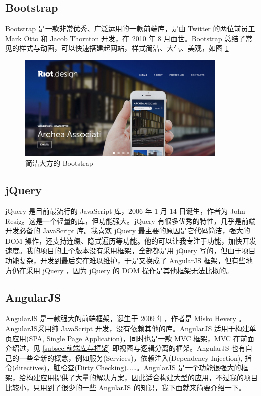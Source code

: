         \subsection{Bootstrap}
          \label{subsec:Bootstrap}
            Bootstrap 是一款非常优秀、广泛运用的一款前端库，是由 Twitter 的两位前员工 Mark Otto 和 Jacob Thornton 开发，在 2010 年 8 月面世。Bootstrap 总结了常见的样式与动画，可以快速搭建起网站，样式简洁、大气、美观，如图 \ref{fig:bootstrap}
            \begin{figure}[H]
              \centering
              \includegraphics[width=10cm]{./img/bootstrap.png}
              \caption{简洁大方的 Bootstrap}
              \label{fig:bootstrap}
            \end{figure}

        \subsection{jQuery}
          \label{subsec:jquery}
            jQuery 是目前最流行的 JavaScript 库，2006 年 1 月 14 日诞生，作者为 John Resig。这是一个轻量的库，但功能强大。jQuery 有很多优秀的特性，几乎是前端开发必备的 JavaScript 库。我喜欢 jQuery 最主要的原因是它代码简洁，强大的 DOM 操作，还支持连缀、隐式遍历等功能。他的可以让我专注于功能，加快开发速度。我的项目的上个版本没有采用框架，全部都是用 jQuery 写的，但由于项目功能复杂，开发到最后实在难以维护，于是又换成了 AngularJS 框架，但有些地方仍在采用 jQuery ，因为 jQuery 的 DOM 操作是其他框架无法比拟的。

        \subsection{AngularJS}
          \label{subsec:angularjs}
            AngularJS 是一款强大的前端框架，诞生于 2009 年，作者是 Misko Hevery 。AngularJS采用纯 JavaScript 开发，没有依赖其他的库。AngularJS 适用于构建单页应用(SPA, Single Page Application)，同时也是一款 MVC 框架，MVC 在前面介绍过，见 \ref{subsec:前端库与框架}  即视图与逻辑分离的框架。AngularJS 也有自己的一些全新的概念，例如服务(Services)，依赖注入(Dependency Injection), 指令(directives)，脏检查(Dirty Checking)……。AngularJS 是一个功能很强大的框架，给构建应用提供了大量的解决方案，因此适合构建大型的应用，不过我的项目比较小，只用到了很少的一些 AngularJS 的知识，我下面就来简要介绍一下。
